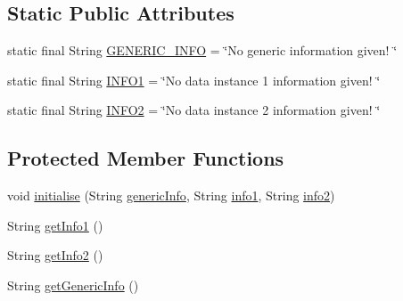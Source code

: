 \subsection*{Static Public Attributes}
\begin{DoxyCompactItemize}
\item 
static final String \hyperlink{classit_1_1emarolab_1_1cagg_1_1core_1_1language_1_1syntax_1_1abstractTree_1_1AbstractNodeDoubleData_3_01I1_00_01I2_01_4_a7abbd84bcdf4a8fec6062304885b93e2}{G\-E\-N\-E\-R\-I\-C\-\_\-\-I\-N\-F\-O} = \char`\"{}No generic information given! \char`\"{}
\item 
static final String \hyperlink{classit_1_1emarolab_1_1cagg_1_1core_1_1language_1_1syntax_1_1abstractTree_1_1AbstractNodeDoubleData_3_01I1_00_01I2_01_4_a0fc31565ff89bbacb069154c7d67e2a0}{I\-N\-F\-O1} = \char`\"{}No data instance 1 information given! \char`\"{}
\item 
static final String \hyperlink{classit_1_1emarolab_1_1cagg_1_1core_1_1language_1_1syntax_1_1abstractTree_1_1AbstractNodeDoubleData_3_01I1_00_01I2_01_4_a32d9370361e05707407e8e10294759c8}{I\-N\-F\-O2} = \char`\"{}No data instance 2 information given! \char`\"{}
\end{DoxyCompactItemize}
\subsection*{Protected Member Functions}
\begin{DoxyCompactItemize}
\item 
void \hyperlink{classit_1_1emarolab_1_1cagg_1_1core_1_1language_1_1syntax_1_1abstractTree_1_1AbstractNodeDoubleData_3_01I1_00_01I2_01_4_ae3b3733dd82327b202959e7d53128680}{initialise} (String \hyperlink{classit_1_1emarolab_1_1cagg_1_1core_1_1language_1_1syntax_1_1abstractTree_1_1AbstractNodeDoubleData_3_01I1_00_01I2_01_4_a5ef36526dc1f963c1c7fb5ca96b098ae}{generic\-Info}, String \hyperlink{classit_1_1emarolab_1_1cagg_1_1core_1_1language_1_1syntax_1_1abstractTree_1_1AbstractNodeDoubleData_3_01I1_00_01I2_01_4_a9cb0eda61491d6c704ee75948a93621a}{info1}, String \hyperlink{classit_1_1emarolab_1_1cagg_1_1core_1_1language_1_1syntax_1_1abstractTree_1_1AbstractNodeDoubleData_3_01I1_00_01I2_01_4_a30a15f6156a57ad8415df26edd3436da}{info2})
\item 
String \hyperlink{classit_1_1emarolab_1_1cagg_1_1core_1_1language_1_1syntax_1_1abstractTree_1_1AbstractNodeDoubleData_3_01I1_00_01I2_01_4_a6f2751cd0cf5a3860269563b692bc748}{get\-Info1} ()
\item 
String \hyperlink{classit_1_1emarolab_1_1cagg_1_1core_1_1language_1_1syntax_1_1abstractTree_1_1AbstractNodeDoubleData_3_01I1_00_01I2_01_4_ac9be0cb3b298d0731c407a092ca0cd42}{get\-Info2} ()
\item 
String \hyperlink{classit_1_1emarolab_1_1cagg_1_1core_1_1language_1_1syntax_1_1abstractTree_1_1AbstractNodeDoubleData_3_01I1_00_01I2_01_4_a2e297bf669a3a4b2503dd989c0799c93}{get\-Generic\-Info} ()
\end{DoxyCompactItemize}
